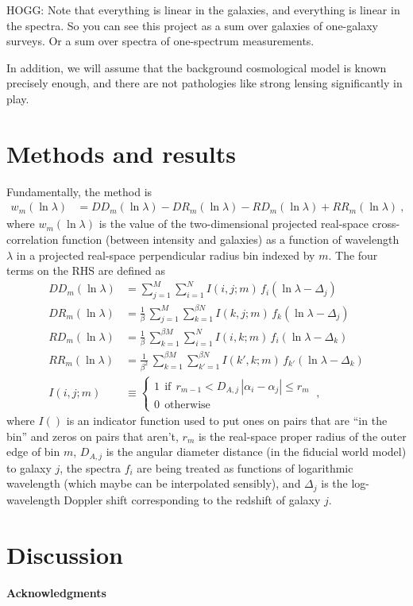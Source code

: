 \documentclass{article}
\begin{document}
HOGG: Note that everything is linear in the galaxies, and everything is linear in the spectra. So you can see this project as a sum over galaxies of one-galaxy surveys. Or a sum over spectra of one-spectrum measurements.

In addition, we will assume that the background cosmological model is known precisely enough, and there are not pathologies like strong lensing significantly in play.

\section{Methods and results}
Fundamentally, the method is
\begin{align}
    w_m(\ln\lambda) &= DD_m(\ln\lambda) - DR_m(\ln\lambda) - RD_m(\ln\lambda) + RR_m(\ln\lambda) ~,
\end{align}
where $w_m(\ln\lambda)$ is the value of the two-dimensional projected real-space cross-correlation function (between intensity and galaxies) as a function of wavelength $\lambda$ in a projected real-space perpendicular radius bin indexed by $m$.
The four terms on the RHS are defined as
\begin{align}
    DD_m(\ln\lambda) &= \sum_{j=1}^{M}\sum_{i=1}^N I(i,j;m)\,f_i(\ln\lambda-\Delta_j) \\
    DR_m(\ln\lambda) &= \frac{1}{\beta}\,\sum_{j=1}^{M}\sum_{k=1}^{\beta N} I(k,j;m)\,f_k(\ln\lambda-\Delta_j) \\
    RD_m(\ln\lambda) &= \frac{1}{\beta}\,\sum_{k=1}^{\beta M}\sum_{i=1}^N I(i,k;m)\,f_i(\ln\lambda-\Delta_k) \\
    RR_m(\ln\lambda) &= \frac{1}{\beta^2}\,\sum_{k=1}^{\beta M}\sum_{k'=1}^{\beta N} I(k',k;m)\,f_{k'}(\ln\lambda-\Delta_k) \\
    I(i,j;m) &\equiv\left\{\begin{array}{l}1~~\text{if}~~r_{m-1}<D_{A,j}\,|\alpha_i-\alpha_j|\leq r_m \\ 0~~\text{otherwise}\end{array}\right.~,
\end{align}
where $I()$ is an indicator function used to put ones on pairs that are ``in the bin'' and zeros on pairs that aren't,
$r_m$ is the real-space proper radius of the outer edge of bin $m$,
$D_{A,j}$ is the angular diameter distance (in the fiducial world model) to galaxy $j$,
the spectra $f_i$ are being treated as functions of logarithmic wavelength (which maybe can be interpolated sensibly),
and $\Delta_j$ is the log-wavelength Doppler shift corresponding to the redshift of galaxy $j$.

\section{Discussion}

\paragraph{Acknowledgments}


\end{document}
